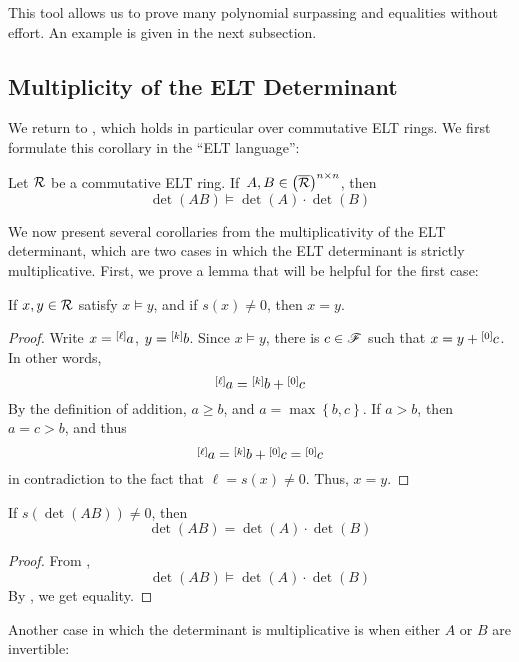 This tool allows us to prove many polynomial surpassing and equalities without effort. An example is given in the next subsection.

\subsection{Multiplicity of the ELT Determinant}

We return to , which holds in particular over commutative ELT rings. We first formulate this corollary in the ``ELT language'':

\begin{cor}\label{cor:elt-det-mult}
Let $\R$ be a commutative ELT ring. If~$A,B\in \left(\overline{\R}\right)^{n\times n}$, then
$$\det\left(AB\right)\vDash\det\left(A\right)\cdot\det\left(B\right)$$
\end{cor}

We now present several corollaries from the multiplicativity of the ELT determinant, which are two cases in which the ELT determinant is strictly multiplicative. First, we prove a lemma that will be helpful for the first case:

\begin{lem}\label{lem:non-zero-surpass-equal}
If $x,y\in\R$ satisfy $x\vDash y$, and if $s\left(x\right)\neq0$, then $x=y$.
\end{lem}
\begin{proof}
Write $x=\layer{a}{\ell}$, $y=\layer{b}{k}$. Since $x\vDash y$, there is $c\in\F$ such that $x=y+\layer{c}{0}$. In other words,
$$\layer{a}{\ell}=\layer{b}{k}+\layer{c}{0}$$
By the definition of addition, $a\ge b$, and $a=\max\left\{b,c\right\}$. If $a>b$, then $a=c>b$, and thus
$$\layer{a}{\ell}=\layer{b}{k}+\layer{c}{0}=\layer{c}{0}$$
in contradiction to the fact that $\ell=s\left(x\right)\neq 0$. Thus, $x=y$.
\end{proof}

\begin{cor}\label{cor:det-is-mult-non-zero-prod}
If $s\left(\det\left(AB\right)\right)\neq 0$, then
$$\det\left(AB\right)=\det\left(A\right)\cdot\det\left(B\right)$$
\end{cor}
\begin{proof}
From ,
$$\det\left(AB\right)\vDash\det\left(A\right)\cdot\det\left(B\right)$$
By , we get equality.
\end{proof}

Another case in which the determinant is multiplicative is when either $A$ or $B$ are invertible:

